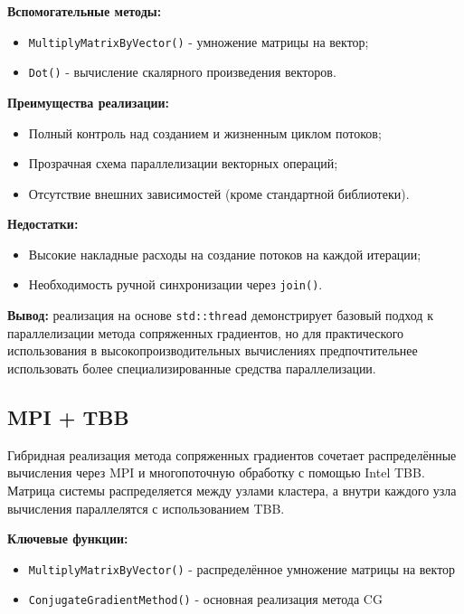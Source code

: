\documentclass[12pt]{article}
\begin{document}
\textbf{Вспомогательные методы:}
\begin{itemize}
  \item \texttt{MultiplyMatrixByVector()} - умножение матрицы на вектор;
  \item \texttt{Dot()} - вычисление скалярного произведения векторов.
\end{itemize}

\textbf{Преимущества реализации:}
\begin{itemize}
  \item Полный контроль над созданием и жизненным циклом потоков;
  \item Прозрачная схема параллелизации векторных операций;
  \item Отсутствие внешних зависимостей (кроме стандартной библиотеки).
\end{itemize}

\textbf{Недостатки:}
\begin{itemize}
  \item Высокие накладные расходы на создание потоков на каждой итерации;
  \item Необходимость ручной синхронизации через \texttt{join()}.
\end{itemize}

\textbf{Вывод:} реализация на основе \texttt{std::thread} демонстрирует базовый подход к параллелизации метода сопряженных градиентов, но для практического использования в высокопроизводительных вычислениях предпочтительнее использовать более специализированные средства параллелизации.


\subsection{MPI + TBB}

Гибридная реализация метода сопряженных градиентов сочетает распределённые вычисления через MPI и многопоточную обработку с помощью Intel TBB. Матрица системы распределяется между узлами кластера, а внутри каждого узла вычисления параллелятся с использованием TBB.

\textbf{Ключевые функции:}
\begin{itemize}
    \item \texttt{MultiplyMatrixByVector()} - распределённое умножение матрицы на вектор
    \item \texttt{ConjugateGradientMethod()} - основная реализация метода CG
\end{itemize}
\end{document}
